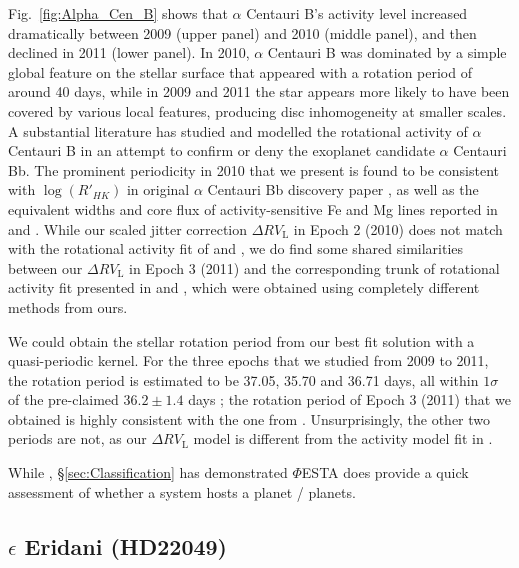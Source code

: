 Fig.~\ref{fig:Alpha_Cen_B} shows that $\alpha$ Centauri B's activity level increased dramatically between 2009 (upper panel) and 2010 (middle panel), and then declined in 2011 (lower panel). In 2010, $\alpha$ Centauri B was dominated by a simple global feature on the stellar surface that appeared with a rotation period of around 40 days, while in 2009 and 2011 the star appears more likely to have been covered by various local features, producing disc inhomogeneity at smaller scales. A substantial literature has studied and modelled the rotational activity of $\alpha$ Centauri B in an attempt to confirm or deny the exoplanet candidate $\alpha$ Centauri Bb. The prominent periodicity in 2010 that we present is found to be consistent with $\log (R'_{HK})$ in original $\alpha$ Centauri Bb discovery paper \cite{Dumusque_Centauri_B}, as well as the equivalent widths and core flux of activity-sensitive Fe and Mg lines reported in \cite{Thompson2017MNRAS} and \cite{Wise2018}. While our scaled jitter correction $\Delta RV_\text{L}$ in Epoch 2 (2010) does not match with the rotational activity fit of \cite{Dumusque_Centauri_B} and \cite{Hatzes2013}, we do find some shared similarities between our $\Delta RV_\text{L}$ in Epoch 3 (2011) and the corresponding trunk of rotational activity fit presented in \cite{Dumusque_Centauri_B} and \cite{Hatzes2013}, which were obtained using completely different methods from ours. 

We could obtain the stellar rotation period from our best fit solution with a quasi-periodic kernel. For the three epochs that we studied from 2009 to 2011, the rotation period is estimated to be 37.05, 35.70 and 36.71 days, all within $1\sigma$ of the pre-claimed $36.2\pm1.4$ days \cite{DeWarf2010}; the rotation period of Epoch 3 (2011) that we obtained is highly consistent with the one from \cite{Dumusque_Centauri_B}. Unsurprisingly, the other two periods are not, as our $\Delta RV_\text{L}$ model is  different from the activity model fit in \cite{Dumusque_Centauri_B}. 

While , \S\ref{sec:Classification} has demonstrated $\mathit{\Phi}$ESTA does provide a quick assessment of whether a system hosts a planet / planets. 





\subsection{$\epsilon$ Eridani (HD22049)}

